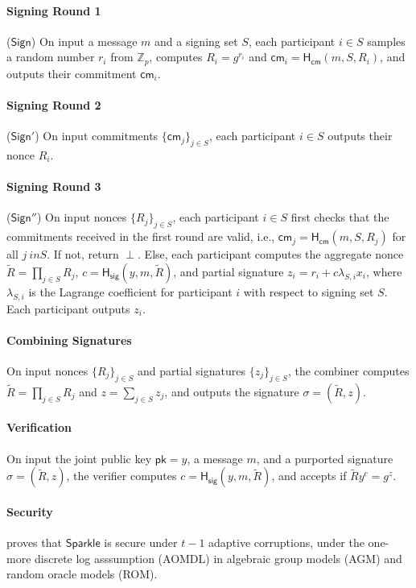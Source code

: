 \paragraph{Signing Round 1} ($\mathsf{Sign}$) On input a message $m$ and a signing set $S$, each participant $i\in S$ samples a random number $r_i$ from $\mathbb{Z}_p$, computes $R_i=g^{r_i}$ and $\mathsf{cm}_i=\mathsf{H_{cm}}(m, S, R_i)$, and outputs their commitment $\mathsf{cm}_i$. 

\paragraph{Signing Round 2} ($\mathsf{Sign'}$) On input commitments $\{\mathsf{cm}_j\}_{j\in S}$, each participant $i\in S$ outputs their nonce $R_i$. 

\paragraph{Signing Round 3} ($\mathsf{Sign''}$) On input nonces $\{R_j\}_{j\in S}$, each participant $i\in S$ first checks that the commitments received in the first round are valid, i.e., $\mathsf{cm}_j=\mathsf{H_{cm}}(m, S, R_j)$ for all $j\ in S$. If not, return $\perp$. Else, each participant computes the aggregate nonce $\tilde{R} = \prod_{j\in S} R_j$, $c=\mathsf{H_{sig}}(y, m, \tilde{R})$, and partial signature $z_i = r_i + c\lambda_{S,i} x_i$, where $\lambda_{S,i}$ is the Lagrange coefficient for participant $i$ with respect to signing set $S$. Each participant outputs $z_i$. 

\paragraph{Combining Signatures} On input nonces $\{R_j\}_{j\in S}$ and partial signatures $\{z_j\}_{j\in S}$, the combiner computes $\tilde{R}=\prod_{j\in S} R_j$ and $z=\sum_{j\in S} z_j$, and outputs the signature $\sigma=(\tilde{R}, z)$. 

\paragraph{Verification} On input the joint public key $\mathsf{pk}=y$, a message $m$, and a purported signature $\sigma=(\tilde{R}, z)$, the verifier computes $c=\mathsf{H_{sig}}(y, m, \tilde{R})$, and accepts if $\tilde{R}y^c=g^z$. 

\paragraph{Security} \cite{DBLP:conf/crypto/CritesKM23} proves that $\mathsf{Sparkle}$ is secure under $t-1$ adaptive corruptions, under the one-more discrete log asssumption (AOMDL) in algebraic group models (AGM) and random oracle models (ROM).  

